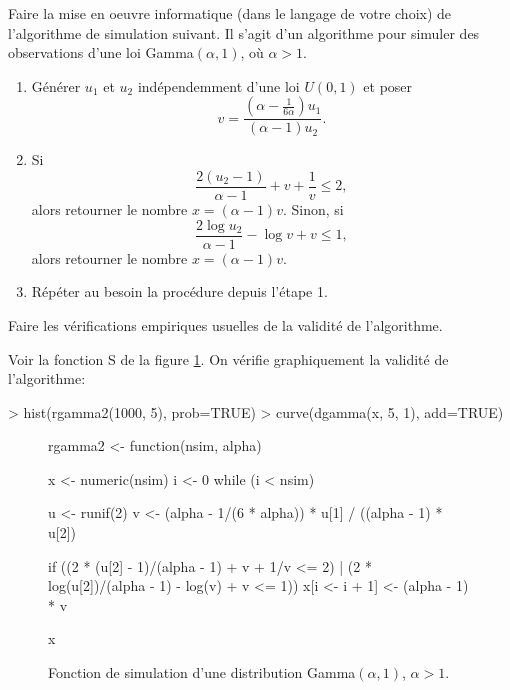 \begin{exercice}
  Faire la mise en oeuvre informatique (dans le langage de votre
  choix) de l'algorithme de simulation suivant. Il s'agit d'un
  algorithme pour simuler des observations d'une loi Gamma$(\alpha,
  1)$, où $\alpha > 1$.
  \begin{enumerate}[1.]
  \item Générer $u_1$ et $u_2$ indépendemment d'une loi $U(0, 1)$ et
    poser
    \begin{displaymath}
      v = \frac{(\alpha - \frac{1}{6\alpha}) u_1}{(\alpha - 1) u_2}.
    \end{displaymath}
  \item Si
    \begin{displaymath}
      \frac{2 (u_2 - 1)}{\alpha - 1} + v + \frac{1}{v} \leq 2,
    \end{displaymath}
    alors retourner le nombre $x = (\alpha - 1) v$. Sinon, si
    \begin{displaymath}
      \frac{2 \log u_2}{\alpha - 1} - \log v + v \leq 1,
    \end{displaymath}
    alors retourner le nombre $x = (\alpha - 1) v$.
  \item Répéter au besoin la procédure depuis l'étape 1.
  \end{enumerate}
  Faire les vérifications empiriques usuelles de la validité de
  l'algorithme.
  \begin{sol}
    \label{ex:simulation:gamma}
    Voir la fonction S de la figure \ref{fig:simulation:gamma}. On vérifie
    graphiquement la validité de l'algorithme:
\begin{Schunk}
\begin{Sinput}
> hist(rgamma2(1000, 5), prob=TRUE)
> curve(dgamma(x, 5, 1), add=TRUE)
\end{Sinput}
\end{Schunk}
    \begin{figure}
      \centering
      \begin{framed}
\begin{Scode}
rgamma2 <- function(nsim, alpha)
{
    x <- numeric(nsim)
    i <- 0
    while (i < nsim)
    {
        u <- runif(2)
        v <- (alpha - 1/(6 * alpha)) * u[1] /
               ((alpha - 1) * u[2])

        if ((2 * (u[2] - 1)/(alpha - 1) +
               v + 1/v <= 2) |
            (2 * log(u[2])/(alpha - 1) -
               log(v) + v <= 1))
            x[i <- i + 1] <- (alpha - 1) * v
    }
    x
}
\end{Scode}
      \end{framed}
      \caption{Fonction de simulation d'une distribution
        Gamma$(\alpha, 1)$, $\alpha > 1$.}
      \label{fig:simulation:gamma}
    \end{figure}
  \end{sol}
\end{exercice}

